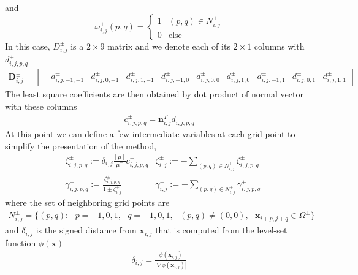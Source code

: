 \documentclass{elsarticle}
\begin{document}
and
\begin{equation}
\omega_{i,j}^\pm (p,q) = \begin{cases}
1 & (p,q)\in N_{i,j}^\pm \\
0 & \text{else}
\end{cases}
\end{equation}
In this case, $D^\pm_{i,j}$ is a $2\times 9$ matrix and we denote each of its $2\times 1$ columns with $d^\pm_{i,j,p,q}$
\begin{align*}
\mathbf{D}^\pm_{i,j}  = \begin{bmatrix}
& d^\pm_{i,j,-1,-1} & d^\pm_{i,j,0,-1} & d^\pm_{i,j,1,-1} & d^\pm_{i,j,-1,0} & d^\pm_{i,j,0,0} & d^\pm_{i,j,1,0} & d^\pm_{i,j,-1,1} & d^\pm_{i,j,0,1} & d^\pm_{i,j,1,1}
\end{bmatrix}
\end{align*}
The least square coefficients are then obtained by dot product of normal vector with these columns 
\begin{align*}
c^\pm_{i,j,p,q} = \mathbf{n}_{i,j}^T  d^\pm_{i,j,p,q}
\end{align*}
At this point we can define a few intermediate variables at each grid point to simplify the presentation of the method,
\begin{align*}
&\zeta_{i,j,p,q}^\pm := \delta_{i,j} \frac{[\mu]}{\mu^\mp}c_{i,j,p,q}^\pm     & \zeta_{i,j}^\pm := -\sum_{(p,q)\in N_{i,j}^\pm} \zeta_{i,j,p,q}^\pm \\
&\gamma_{i,j,p,q}^\pm := \frac{\zeta_{i,j,p,q}^\pm}{1 \pm \zeta^\pm_{i,j}}   & \gamma^\pm_{i,j} := -\sum_{(p,q)\in N_{i,j}^\pm} \gamma_{i,j,p,q}^\pm
\end{align*}
where the set of neighboring grid points are 
\begin{align*}
N_{i,j}^\pm = \{(p,q) :\ \ \  p=-1,0,1, \ \ \  q=-1,0,1, \ \ \ (p,q)\neq (0,0), \ \ \ \mathbf{x}_{i+p,j+q}\in \Omega^\pm \}
\end{align*}
and $\delta_{i,j}$ is the signed distance from $\mathbf{x}_{i,j}$ that is computed from the level-set function $\phi(\mathbf{x})$
\begin{align*}
\delta_{i,j}=\frac{\phi(\mathbf{x}_{i,j})}{|\nabla \phi(\mathbf{x}_{i,j})|}
\end{align*}
\end{document}
